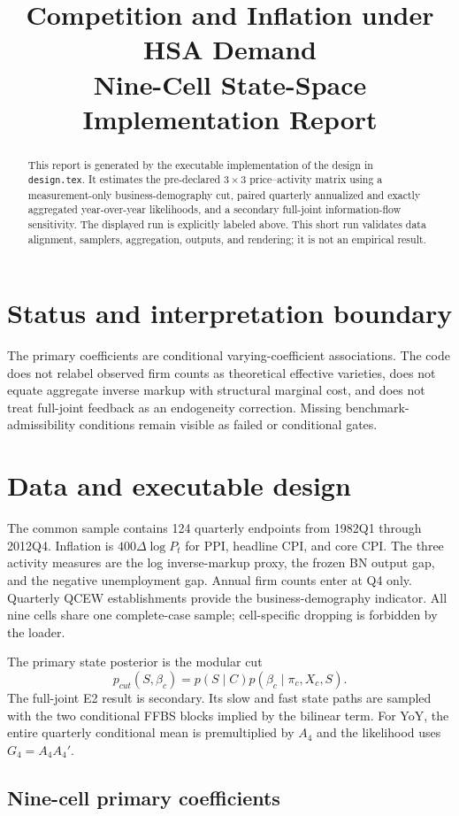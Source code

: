 \documentclass[11pt]{article}
\title{\textbf{Competition and Inflation under HSA Demand}\\
\large Nine-Cell State-Space Implementation Report}
\author{}
\date{\RunLabel}
\providecommand{\ResultRoot}{../results/nine_cell_design/test_run}
\providecommand{\RunAbstractNotice}{This short run validates data alignment, samplers,
aggregation, outputs, and rendering; it is not an empirical result.}
\begin{document}
\maketitle
\begin{abstract}
This report is generated by the executable implementation of the design in
\texttt{design.tex}. It estimates the pre-declared $3\times3$ price--activity
matrix using a measurement-only business-demography cut, paired quarterly annualized
and exactly aggregated year-over-year likelihoods, and a secondary full-joint
information-flow sensitivity. The displayed run is explicitly labeled above.
\RunAbstractNotice
\end{abstract}
\clearpage
\tableofcontents
\clearpage

\section{Status and interpretation boundary}
The primary coefficients are conditional varying-coefficient associations. The code
does not relabel observed firm counts as theoretical effective varieties, does not
equate aggregate inverse markup with structural marginal cost, and does not treat
full-joint feedback as an endogeneity correction. Missing benchmark-admissibility
conditions remain visible as failed or conditional gates.

\section{Data and executable design}
The common sample contains 124 quarterly endpoints from 1982Q1 through 2012Q4.
Inflation is $400\Delta\log P_t$ for PPI, headline CPI, and core CPI. The three
activity measures are the log inverse-markup proxy, the frozen BN output gap, and the
negative unemployment gap. Annual firm counts enter at Q4 only. Quarterly QCEW
establishments provide the business-demography indicator. All nine cells share one
complete-case sample; cell-specific dropping is forbidden by the loader.

The primary state posterior is the modular cut
\[
p_{cut}(S,\beta_c)=p(S\mid C)p(\beta_c\mid\pi_c,X_c,S).
\]
The full-joint E2 result is secondary. Its slow and fast state paths are sampled with
the two conditional FFBS blocks implied by the bilinear term. For YoY, the entire
quarterly conditional mean is premultiplied by $A_4$ and the likelihood uses
$G_4=A_4A_4'$.

\begin{landscape}
\section{Nine-cell primary coefficients}
\begingroup
\setlength{\tabcolsep}{3pt}
\scriptsize

\endgroup
\end{landscape}
\end{document}
